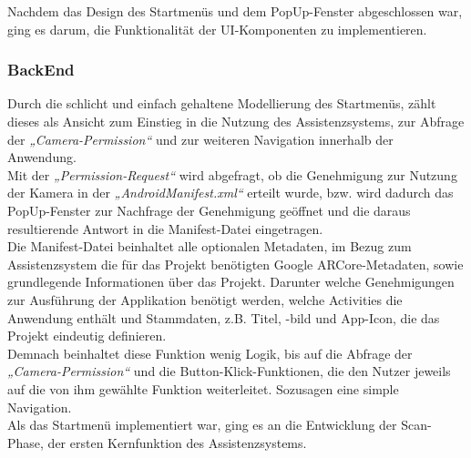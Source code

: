 Nachdem das Design des Startmenüs und dem PopUp-Fenster abgeschlossen war, ging es darum, die Funktionalität der UI-Komponenten zu implementieren. 
\subsubsection{BackEnd}
Durch die schlicht und einfach gehaltene Modellierung des Startmenüs, zählt dieses als Ansicht zum Einstieg in die Nutzung des Assistenzsystems, zur Abfrage der 
\textit{„Camera-Permission“} und zur weiteren Navigation innerhalb der Anwendung.
\\ 
Mit der \textit{„Permission-Request“} wird abgefragt, ob die Genehmigung zur Nutzung der Kamera in der \textit{„AndroidManifest.xml“} erteilt wurde, bzw. wird dadurch 
das PopUp-Fenster zur Nachfrage der Genehmigung geöffnet und die daraus resultierende Antwort in die Manifest-Datei eingetragen. 
\\ 
\linebreak
Die Manifest-Datei beinhaltet alle optionalen Metadaten, im Bezug zum Assistenzsystem die für das Projekt benötigten Google ARCore-Metadaten, sowie grundlegende 
Informationen über das Projekt. Darunter welche Genehmigungen zur Ausführung der Applikation benötigt werden, welche Activities die Anwendung enthält und 
Stammdaten, z.B. Titel, -bild und App-Icon, die das Projekt eindeutig definieren.
\\ 
\linebreak
Demnach beinhaltet diese Funktion wenig Logik, bis auf die Abfrage der \textit{„Camera-Permission“} und die Button-Klick-Funktionen, die den Nutzer 
jeweils auf die von ihm gewählte Funktion weiterleitet. Sozusagen eine simple Navigation.
\\ 
\linebreak
Als das Startmenü implementiert war, ging es an die Entwicklung der Scan-Phase, der ersten Kernfunktion des Assistenzsystems.  

